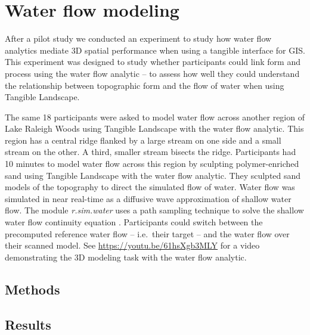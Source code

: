 \documentclass[Afour,sageh,times]{sagej}
\begin{document}




\section{Water flow modeling}

After a pilot study \cite{Harmon2016}
we conducted an experiment to study 
how water flow analytics 
mediate 3D spatial performance
when using a tangible interface for GIS.
%
This experiment was designed to study whether
participants could link form and process
using the water flow analytic -- to assess
how well they could understand the relationship 
between topographic form 
and the flow of water 
when using Tangible Landscape.

The same 18 participants were asked to model water flow 
across another region of Lake Raleigh Woods
using Tangible Landscape with the water flow analytic.
This region has a central ridge 
flanked by a large stream on one side 
and a small stream on the other.  
A third, smaller stream bisects the ridge.
Participants had 10 minutes to model water flow across this region
by sculpting polymer-enriched sand using Tangible Landscape 
with the water flow analytic. 
They sculpted sand models of the topography
to direct the simulated flow of water.  
Water flow was simulated in near real-time 
as a diffusive wave approximation of shallow water flow.
The module \textit{r.sim.water} \cite{r.sim.water}
uses a path sampling technique to solve the shallow water flow continuity equation \cite{Mitasova2004}.
Participants could switch between the precomputed reference water flow 
-- i.e.~their target -- 
and the water flow over their scanned model.
%
See \url{https://youtu.be/61hsXgb3MLY}
for a video demonstrating the 3D modeling task 
with the water flow analytic.




\subsection{Methods}



\subsection{Results}
\end{document}
